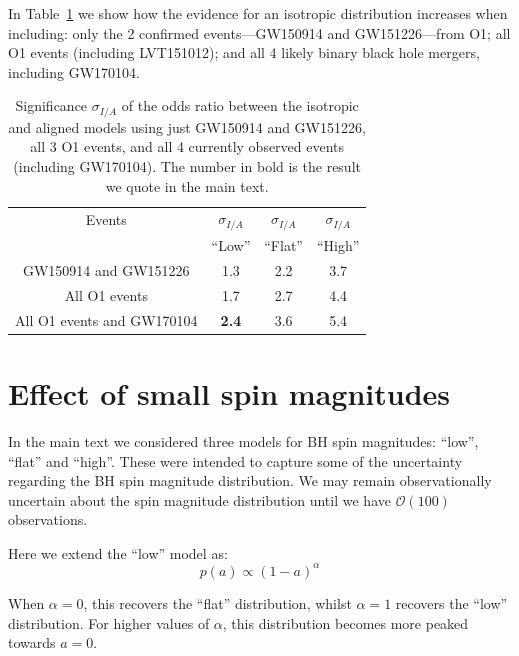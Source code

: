 \documentclass{nature-arxiv}
\begin{document}
\begin{methods}
In Table~\ref{tab:accumulation} we show how the evidence for an isotropic distribution increases when including: only the 2 confirmed events---GW150914 and GW151226---from O1; all O1 events (including LVT151012); and all 4 likely binary black hole mergers, including GW170104. 

\begin{table}
\begin{centering}
\begin{tabular}{ c |  c  |  c  | c  }
  \hline 
  \hline
Events & $\sigma_{I/A}$ &  $\sigma_{I/A}$ & $\sigma_{I/A}$ \\ 
 & ``Low'' & ``Flat'' & ``High'' \\ \hline
GW150914 and GW151226 &  1.3 & 2.2 & 3.7 \\ %
All O1 events & 1.7 & 2.7 & 4.4 \\ %
All O1 events and GW170104 & \textbf{2.4} & 3.6 & 5.4 \\ \hline
\end{tabular}
\caption[]{Significance $\sigma_{I/A}$ of the odds ratio between the isotropic and aligned models using just GW150914 and GW151226, all 3 O1 events, and all 4 currently observed events (including GW170104). The number in bold is the result we quote in the main text.}
\label{tab:accumulation}
\end{centering}
\end{table}


\section{Effect of small spin magnitudes}
\label{sec:smallspins}

In the main text we considered three models for BH spin magnitudes:
``low'', ``flat'' and ``high''. These were intended to capture some of
the uncertainty regarding the BH spin magnitude distribution.  We may
remain observationally uncertain about the spin magnitude distribution
until we have $\mathcal{O}(100)$
observations\cite{2017arXiv170306869F,2017arXiv170306223G}.

Here we extend the ``low'' model as:
%
\begin{equation}
p(a) \propto (1 - a)^{\alpha}
\label{eq:lowspinalpha}
\end{equation}
%

When $\alpha = 0$, this recovers the ``flat'' distribution, whilst
$\alpha = 1$ recovers the ``low'' distribution. For higher values of
$\alpha$, this distribution becomes more peaked towards
$a = 0$.


\end{methods}
\end{document}
